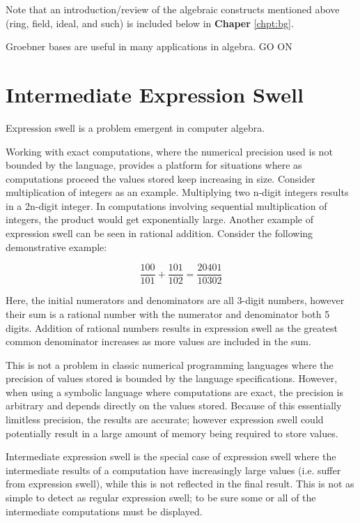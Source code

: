 \documentclass[letterpaper,12pt,titlepage,oneside,final]{book}
\begin{document}
Note that an introduction/review of the algebraic constructs mentioned above (ring, field, ideal, and such) is included below in \textbf{Chaper} \ref{chpt:bg}.    

Groebner bases are useful in many applications in algebra.  GO ON

\section{Intermediate Expression Swell}

Expression swell is a problem emergent in computer algebra.

Working with exact computations, where the numerical precision used is not bounded by the language, provides a platform for situations where as computations proceed the values stored keep increasing in size.  Consider multiplication of integers as an example.  Multiplying two n-digit integers results in a 2n-digit integer.  In computations involving sequential multiplication of integers, the product would get exponentially large.  Another example of expression swell can be seen in rational addition. Consider the following demonstrative example:

\begin{equation*}
  \frac{100}{101} + \frac{101}{102} = \frac{20401}{10302}
\end{equation*}

Here, the initial numerators and denominators are all 3-digit numbers, however their sum is a rational number with the numerator and denominator both 5 digits.  Addition of rational numbers results in expression swell as the greatest common denominator increases as more values are included in the sum.

This is not a problem in classic numerical programming languages where the precision of values stored is bounded by the language specifications.  However, when using a symbolic language where computations are exact, the precision is arbitrary and depends directly on the values stored.  Because of this essentially limitless precision, the results are accurate; however expression swell could potentially result in a large amount of memory being required to store values.

Intermediate expression swell is the special case of expression swell where the intermediate results of a computation have increasingly large values (i.e. suffer from expression swell), while this is not reflected in the final result.  This is not as simple to detect as regular expression swell; to be sure some or all of the intermediate computations must be displayed. 
\end{document}
